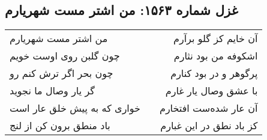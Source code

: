 \begin{center}
\section*{غزل شماره ۱۵۶۳: من اشتر مست شهریارم}
\label{sec:1563}
\begin{longtable}{l p{0.5cm} r}
من اشتر مست شهریارم
&&
آن خایم کز گلو برآرم
\\
چون گلبن روی اوست خویم
&&
اشکوفه من بود نثارم
\\
چون بحر اگر ترش کنم رو
&&
پرگوهر و در بود کنارم
\\
گر یار وصال ما نجوید
&&
با عشق وصال یار غارم
\\
خواری که به پیش خلق عار است
&&
آن عار شده‌ست افتخارم
\\
باد منطق برون کن از لنج
&&
کز باد نطق در این غبارم
\\
\end{longtable}
\end{center}

